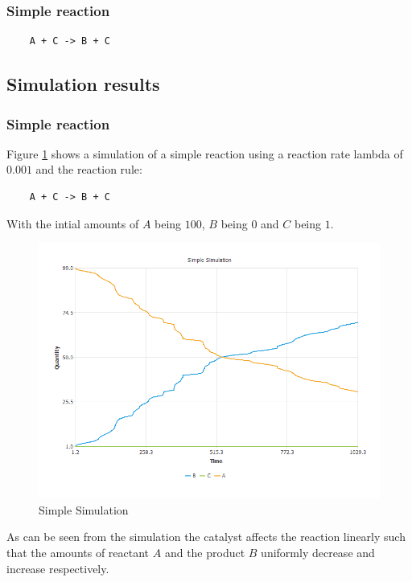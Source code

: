\subsubsection{Simple reaction}
\begin{verbatim}
    A + C -> B + C
\end{verbatim}

\subsection{Simulation results}
\subsubsection{Simple reaction}
Figure \ref{fig:Simple Simulation} shows a simulation of a simple reaction using a reaction rate lambda of $0.001$ and the reaction rule:
\begin{verbatim}
    A + C -> B + C
\end{verbatim}

With the intial amounts of $A$ being $100$, $B$ being $0$ and $C$ being $1$.

\begin{figure}[h!]
	\includegraphics[scale=0.6]{images/Simple Simulation.png}
	\centering
	\caption{Simple Simulation}
	\label{fig:Simple Simulation}
\end{figure}

As can be seen from the simulation the catalyst affects the reaction linearly such that the amounts of reactant $A$ and the product $B$ uniformly decrease and increase respectively.

